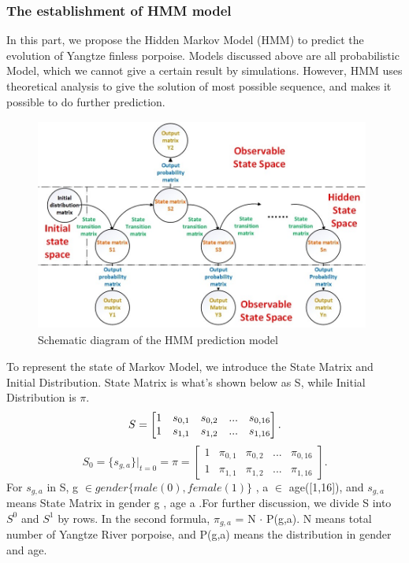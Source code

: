 \documentclass[12pt]{article}  %
\begin{document}
\subsubsection{The establishment of HMM model}
In this part, we propose the Hidden Markov Model (HMM) to predict the evolution of Yangtze finless porpoise. Models discussed above are all probabilistic Model, which we cannot give a certain result by simulations. However, HMM uses theoretical analysis to give the solution of most possible sequence, and makes it possible to do further prediction.

\begin{figure}[htbp]%
	\small
	\centering
	\includegraphics[height=7cm,width=11cm]{figures/HMM1.jpg}%
	\caption{Schematic diagram of the HMM  prediction model}%
\end{figure}

\begin{Definition}
To represent the state of Markov Model, we introduce the State Matrix and Initial Distribution. State Matrix is what's shown below as S, while Initial Distribution is $\pi$.
\begin{equation}
S = 
\left[
\begin{matrix}
    1 & s_{0,1} & s_{0,2} & ... & s_{0,16} \\
    1 & s_{1,1} & s_{1,2} & ... & s_{1,16}
\end{matrix} \right
]. \\
\end{equation}
\begin{equation}
S_0 = \{ s_{g,a} \}|_{t=0} = \pi =
\left[
\begin{matrix}
    1 & \pi_{0,1} & \pi_{0,2} & ... & \pi_{0,16} \\
    1 & \pi_{1,1} & \pi_{1,2} & ... & \pi_{1,16}
\end{matrix} \right] . 
\end{equation}
For $s_{g,a}$ in S, g $\in gender\{ male(0),female(1) \}$ , a $\in$ age([1,16]), and $s_{g,a}$ means State Matrix in gender g , age a .For further discussion, we divide S into $S^0$ and $S^1$ by rows.
In the second formula, $\pi_{g,a}$ = N $\cdot$ P(g,a). N means total number of Yangtze River porpoise, and P(g,a) means the distribution in gender and age.
\end{Definition}
\end{document}
